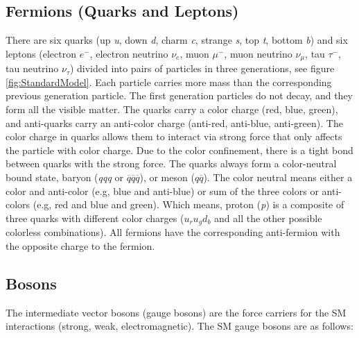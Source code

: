 \subsection{Fermions (Quarks and Leptons)}
There are six quarks (up \textit{u}, down \textit{d}, charm \textit{c}, strange \textit{s}, top \textit{t}, bottom \textit{b}) and six leptons (electron $e^{-}$, electron neutrino $\nu_{e}$, muon $\mu^{-}$, muon neutrino $\nu_{\mu}$, tau $\tau^{-}$, tau neutrino $\nu_{\tau}$) divided into pairs of particles in three generations, see figure \ref{fig:StandardModel}. Each particle carries more mass than the corresponding previous generation particle. The first generation particles do not decay, and they form all the visible matter. The quarks carry a color charge (red, blue, green), and anti-quarks carry an anti-color charge (anti-red, anti-blue, anti-green). The color charge in quarks allows them to interact via strong force that only affects the particle with color charge. Due to the color confinement, there is a tight bond between quarks with the strong force. The quarks always form a color-neutral bound state, baryon (\textit{qqq} or $\overline{q}\overline{q}\overline{q}$), or meson ($q\overline{q}$). The color neutral means either a color and anti-color (e.g, blue and anti-blue) or sum of the three colors or anti-colors (e.g, red and blue and green). Which means, proton (\textit{p}) is a composite of three quarks with different color charges ($u_{r}u_{g}d_{b}$ and all the other possible colorless combinations). All fermions have the corresponding anti-fermion with the opposite charge to the fermion.

\subsection{Bosons}

The intermediate vector bosons (gauge bosons) are the force carriers for the SM interactions (strong, weak, electromagnetic). The SM gauge bosons are as follows:  

